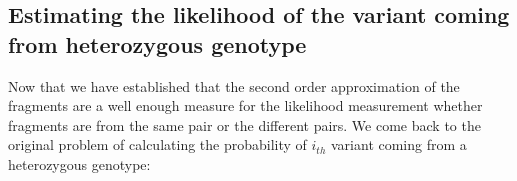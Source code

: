 \documentclass[9pt]{osa-supplemental-document}
\begin{document}






\subsection{Estimating the likelihood of the variant coming from heterozygous genotype}

Now that we have established that the second order approximation of the fragments are a well enough measure for the likelihood measurement whether fragments are from the same pair or the different pairs. 
We come back to the original problem of calculating the probability of $i_{th}$
variant coming from a heterozygous genotype:
\\
\end{document}
